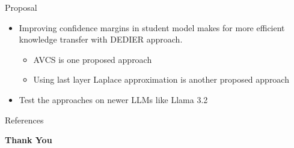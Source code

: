 \documentclass[aspectratio=169,xcolor=dvipsnames]{beamer}
\begin{document}
\begin{frame}{Proposal}
    \begin{itemize}
        \item Improving confidence margins in student model makes for more efficient knowledge transfer with DEDIER approach.
            \begin{itemize}
                \item AVCS is one proposed approach
                \item Using last layer Laplace approximation is another proposed approach
            \end{itemize}
        \item Test the approaches on newer LLMs like Llama 3.2 
        
    \end{itemize}
\end{frame}


\begin{frame}{References}
    \footnotesize
    
    
\end{frame}


\begin{frame}
    \Huge{\centerline{\textbf{Thank You}}}
\end{frame}

\end{document}
